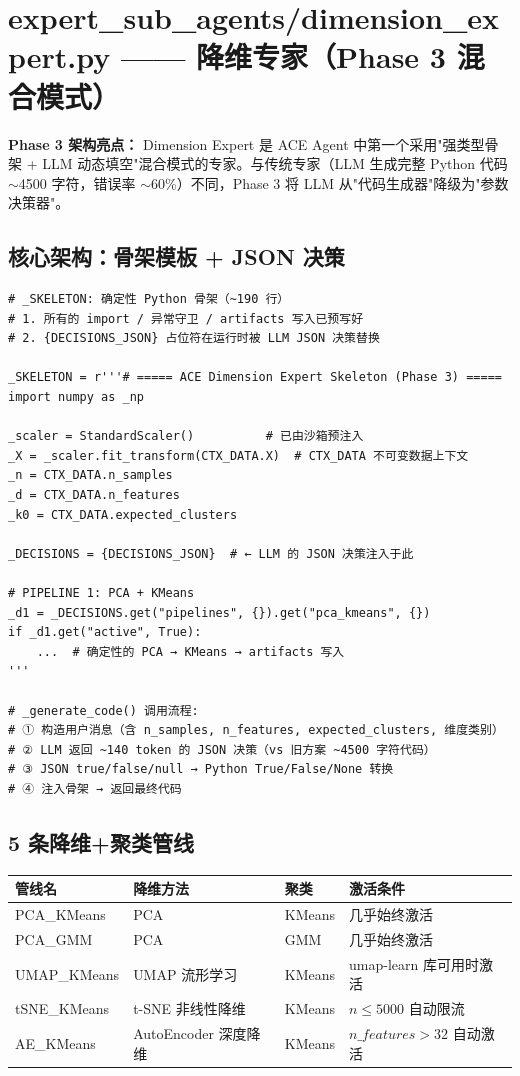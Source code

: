 \documentclass[11pt,a4paper]{ctexbook}
\begin{document}
\section{expert\_sub\_agents/dimension\_expert.py —— 降维专家（Phase 3 混合模式）}

\textbf{Phase 3 架构亮点：} Dimension Expert 是 ACE Agent 中第一个采用"强类型骨架 + LLM 动态填空"混合模式的专家。与传统专家（LLM 生成完整 Python 代码 $\sim$4500 字符，错误率 $\sim$60\%）不同，Phase 3 将 LLM 从"代码生成器"降级为"参数决策器"。

\subsection{核心架构：骨架模板 + JSON 决策}

\begin{verbatim}
# _SKELETON: 确定性 Python 骨架（~190 行）
# 1. 所有的 import / 异常守卫 / artifacts 写入已预写好
# 2. {DECISIONS_JSON} 占位符在运行时被 LLM JSON 决策替换

_SKELETON = r'''# ===== ACE Dimension Expert Skeleton (Phase 3) =====
import numpy as _np

_scaler = StandardScaler()          # 已由沙箱预注入
_X = _scaler.fit_transform(CTX_DATA.X)  # CTX_DATA 不可变数据上下文
_n = CTX_DATA.n_samples
_d = CTX_DATA.n_features
_k0 = CTX_DATA.expected_clusters

_DECISIONS = {DECISIONS_JSON}  # ← LLM 的 JSON 决策注入于此

# PIPELINE 1: PCA + KMeans
_d1 = _DECISIONS.get("pipelines", {}).get("pca_kmeans", {})
if _d1.get("active", True):
    ...  # 确定性的 PCA → KMeans → artifacts 写入
'''

# _generate_code() 调用流程:
# ① 构造用户消息（含 n_samples, n_features, expected_clusters, 维度类别）
# ② LLM 返回 ~140 token 的 JSON 决策（vs 旧方案 ~4500 字符代码）
# ③ JSON true/false/null → Python True/False/None 转换
# ④ 注入骨架 → 返回最终代码
\end{verbatim}

\subsection{5 条降维+聚类管线}

\begin{center}
\begin{tabular}{p{2.5cm} p{3cm} p{1.5cm} p{5.5cm}}
    \toprule
    \textbf{管线名} & \textbf{降维方法} & \textbf{聚类} & \textbf{激活条件} \\
    \midrule
    PCA\_KMeans  & PCA & KMeans & 几乎始终激活 \\
    PCA\_GMM     & PCA & GMM    & 几乎始终激活 \\
    UMAP\_KMeans & UMAP 流形学习 & KMeans & umap-learn 库可用时激活 \\
    tSNE\_KMeans & t-SNE 非线性降维 & KMeans & $n \leq 5000$ 自动限流 \\
    AE\_KMeans   & AutoEncoder 深度降维 & KMeans & $n\_features > 32$ 自动激活 \\
    \bottomrule
\end{tabular}
\end{center}
\end{document}
